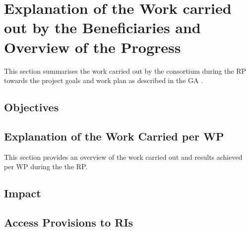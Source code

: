
\clearpage
\section{Explanation of the Work carried out by the Beneficiaries and Overview of the Progress}
\label{sec:work-carried-out}


This section summarises the work carried out by the  consortium during the  \ac{RP} towards the project goals and work plan as described in the \ac{GA} \cite{bib:grantagreement2019}. 

\subsection{Objectives}


\subsection{Explanation of the Work Carried per \acl{WP}}

This section provides an overview of the work carried out and results achieved per \ac{WP} 
during the the  \acl{RP}.   





\subsection{Impact}


\subsection{Access Provisions to \aclp{RI}}


